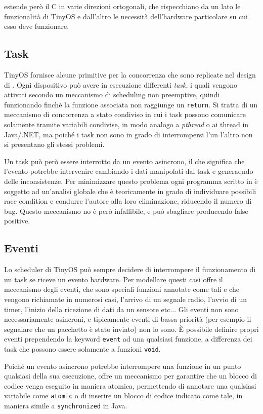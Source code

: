 \documentclass[twoside,11pt,a4paper,italian,openany]{book}
\begin{document}
\nesc estende però il C in varie direzioni ortogonali, che rispecchiano da un lato le 
funzionalità di TinyOS e dall'altro le necessità dell'hardware particolare su cui esso deve 
funzionare. 

\subsection{Task}
TinyOS fornisce alcune primitive per la concorrenza che sono replicate nel design di \nesc.
Ogni dispositivo può avere in esecuzione differenti \emph{task}, i quali vengono attivati 
secondo un meccanismo di scheduling non preemptive, quindi funzionando finché la funzione 
associata non raggiunge un \texttt{return}. 
Si tratta di un meccanismo di concorrenza a stato condiviso in cui 
i task possono comunicare solamente tramite variabili condivise, in modo analogo a 
\emph{pthread} o ai thread in Java/.NET,  ma poiché i task non sono in grado di 
interrompersi l'un l'altro non si presentano gli stessi problemi.

Un task può però essere interrotto da un evento asincrono, il che significa che l'evento 
potrebbe intervenire cambiando i dati manipolati dal task e generaqndo delle inconsistenze.
Per minimizzare questo problema ogni programma scritto in  \nesc è soggetto ad 
un'analisi globale che è teoricamente in grado di individuare possibili race condition e 
condurre l'autore alla loro eliminazione, riducendo il numero di bug. 
Questo meccanismo no è però infallibile, e può sbagliare producendo false positive.


\subsection{Eventi}
Lo scheduler di TinyOS può sempre decidere di interrompere il funzionamento di un task 
se riceve un evento hardware. 
Per modellare questi casi \nesc offre il meccanismo degli eventi, 
che sono speciali funzioni annotate come tali e che vengono richiamate in numerosi 
casi, l'arrivo di un segnale radio, l'avvio di un timer, l'inizio della ricezione di dati da un sensore etc...
Gli eventi non sono necessariamente asincroni, e tipicamente eventi di bassa priorità (per esempio il segnalare che un pacchetto è stato inviato) non lo sono.
\`E possibile definire propri eventi prependendo la keyword \texttt{event} ad una qualsiasi 
funzione, a differenza dei task che possono essere solamente a funzioni \texttt{void}.

Poiché un evento asincrono potrebbe interrompere una funzione in un punto qualsiasi della sua esecuzione, \nesc offre un meccanismo per garantire che un blocco di codice venga eseguito in 
maniera atomica,  permettendo di annotare una qualsiasi variabile come \texttt{atomic} o 
di inserire un blocco di codice indicato come tale, in maniera simile a \texttt{synchronized} 
in Java.
\end{document}
